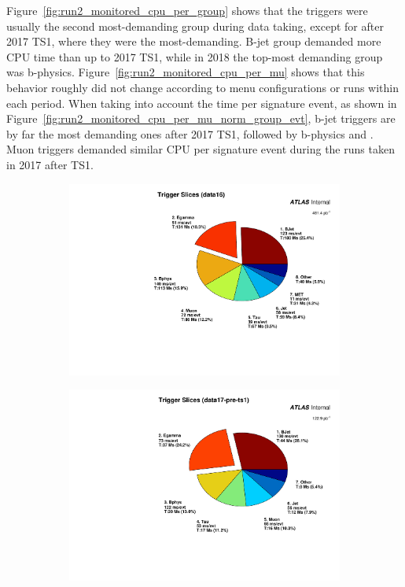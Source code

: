 Figure~\ref{fig:run2_monitored_cpu_per_group} shows that the \egamma{} triggers
were usually the second most-demanding group during data taking, except for
after 2017 TS1, where they were the most-demanding. B-jet group demanded more CPU
time than \egamma{} up to 2017 TS1, while in 2018 the top-most demanding group
was b-physics.  Figure~\ref{fig:run2_monitored_cpu_per_mu} shows that this
behavior roughly did not change according to menu configurations or runs within
each period. When taking into account the time per signature event, as shown in
Figure~\ref{fig:run2_monitored_cpu_per_mu_norm_group_evt}, b-jet triggers are by
far the most demanding ones after 2017 TS1, followed by b-physics and \egamma{}.
Muon triggers demanded similar CPU per signature event during the runs taken in
2017 after TS1.

\begin{figure}[h!tb]
\centering
\begin{subfigure}[c]{.48\textwidth}
  \includegraphics[width=\textwidth]{appendices/figures/menu_cpu_measurements/run2_slice_cpu_slices_pie_data16.pdf}
\caption{}%
\label{fig:run2_monitored_cpu_per_group_data16}
\end{subfigure}
\hfill
\begin{subfigure}[c]{.48\textwidth}
  \includegraphics[width=\textwidth]{appendices/figures/menu_cpu_measurements/run2_slice_cpu_slices_pie_data17-pre-ts1.pdf}

\end{subfigure}
\end{figure}
